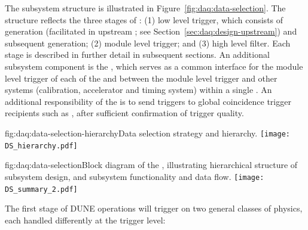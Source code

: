 The  subsystem structure is illustrated in
Figure~\ref{fig:daq:data-selection}. The structure
reflects the three stages of : (1) low level trigger, which consists of
 generation (facilitated in upstream ; see
Section~\ref{sec:daq:design-upstream}) and subsequent
 generation; (2) module level trigger; and (3)
high level filter. Each stage is described in further detail in subsequent
sections. An additional subsystem component is the ,
which serves as a common interface for the
module level trigger of each of the   and between
the module level trigger and other systems (calibration,
accelerator and timing system) within a single
. An additional responsibility of the
 is to send  triggers
to global coincidence trigger recipients such as 
\cite{snews}, after sufficient confirmation of trigger quality.

\begin{dunefigure}{fig:daq:data-selection-hierarchy}{Data selection
    strategy and hierarchy.}
  \texttt{[image: DS\_hierarchy.pdf]}
\end{dunefigure}

\begin{dunefigure}{fig:daq:data-selection}{Block diagram of the  
    , illustrating hierarchical structure of
    subsystem design, and subsystem functionality and data flow.}
  \texttt{[image: DS\_summary\_2.pdf]}
\end{dunefigure}

The first stage of DUNE  operations will trigger on two general
classes of physics, each handled differently at the trigger level:

